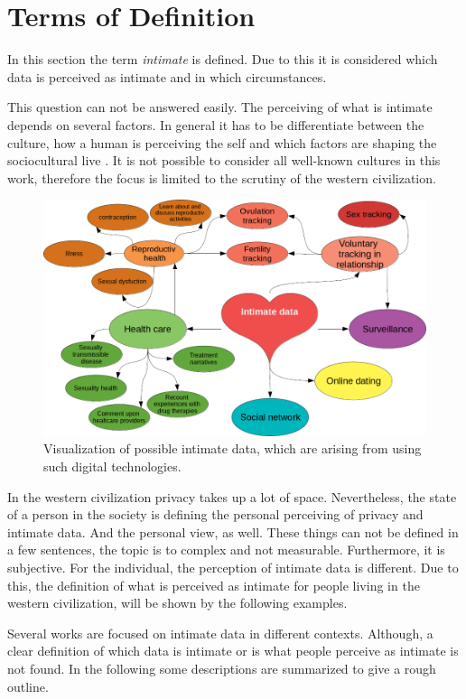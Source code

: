 \section{Terms of Definition}
\label{sec:terms_of_definition}
In this section the term \textit{intimate} is defined. Due to this it is considered which data is perceived as intimate and in which circumstances.

This question can not be answered easily. The perceiving of what is intimate depends on several factors.
In general it has to be differentiate between the culture, how a human is perceiving the self and which factors are shaping the sociocultural live \cite{carrithers1985category}. It is not possible to consider all well-known cultures in this work, therefore the focus is limited to the scrutiny of the western civilization. 
\begin{figure}[htb]
	\centering
	\includegraphics[width=\linewidth]{img/cluster_heart.png}
	\caption{Visualization of possible intimate data, which are arising from using such digital technologies.}
	\label{fig:cluster}
\end{figure}
In the western civilization privacy takes up a lot of space. Nevertheless, the state of a person in the society is defining the personal perceiving of privacy and intimate data. And the personal view, as well.
These things can not be defined in a few sentences, the topic is to complex and not measurable. Furthermore, it is subjective. For the individual, the perception of intimate data is different. Due to this, the definition of what is perceived as intimate for people living in the western civilization, will be shown by the following examples.

Several works are focused on intimate data in different contexts. Although, a clear definition of which data is intimate or is what people perceive as intimate is not found.
In the following some descriptions are summarized to give a rough outline.

